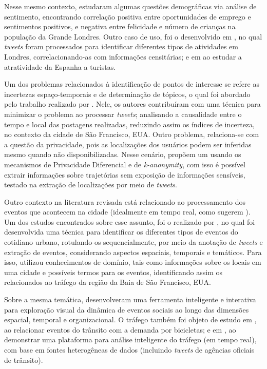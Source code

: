 \documentclass[
	12pt,				%
	oneside,			%
	a4paper,			%
	english,			%
	brazil				%
	]{abntex2ppgsi}
\begin{document}
{{Nesse mesmo contexto, \cite{Guo2016} estudaram algumas questões demográficas via análise de sentimento, encontrando correlação positiva entre oportunidades de emprego e sentimentos positivos, e negativa entre felicidade e número de crianças na população da Grande Londres. Outro caso de uso, foi o desenvolvido em \cite{Steiger2015Census}, no qual \textit{tweets} foram processados para identificar diferentes tipos de atividades em Londres, correlacionando-as com informações censitárias; e em \cite{Sobolevsky2015} ao estudar a atratividade da Espanha a turistas.

Um dos problemas relacionados à identificação de pontos de interesse se refere as incertezas espaço-temporais e de determinação de tópicos, o qual foi abordado pelo trabalho realizado por \cite{Bendler2014}. Nele, os autores contribuíram com uma técnica para minimizar o problema ao processar \textit{tweets}; analisando a causalidade entre o tempo e local das postagens realizadas, reduzindo assim os índices de incerteza, no contexto da cidade de São Francisco, EUA. Outro problema, relaciona-se com a questão da privacidade, pois as localizações dos usuários podem ser inferidas mesmo quando não disponibilizadas. Nesse cenário, \cite{Wang2017} propõem um  usando os mecanismos de Privacidade Diferencial e de \textit{k-anonymity}, com isso é possível extrair informações sobre trajetórias sem exposição de informações sensíveis, testado na extração de localizações por meio de \textit{tweets}. 

Outro contexto na literatura revisada está relacionado ao processamento dos eventos que acontecem na cidade (idealmente em tempo real, como sugerem \cite{Soomro2016}). Um dos estudos encontrados sobre esse assunto, foi o realizado por \cite{Anantharam2015}, no qual foi desenvolvida uma técnica para identificar os diferentes tipos de eventos do cotidiano urbano, rotulando-os sequencialmente, por meio da anotação de \textit{tweets} e extração de eventos, considerando aspectos espaciais, temporais e temáticos. Para isso, utilizou conhecimentos de domínio, tais como informações sobre os locais em uma cidade e possíveis termos para os eventos, identificando assim os relacionados ao tráfego da região da Baia de São Francisco, EUA. 

Sobre a mesma temática, \cite{DiLorenzo2013} desenvolveram uma ferramenta inteligente e interativa para exploração visual da dinâmica de eventos sociais ao longo das dimensões espacial, temporal e organizacional. O tráfego também foi objeto de estudo em \cite{Chen2016}, ao relacionar eventos do trânsito com a demanda por bicicletas; e em \cite{Lecue2014}, ao demonstrar uma plataforma para análise inteligente do tráfego (em tempo real), com base em fontes heterogêneas de dados (incluindo \textit{tweets} de agências oficiais de trânsito).

}}
\end{document}
